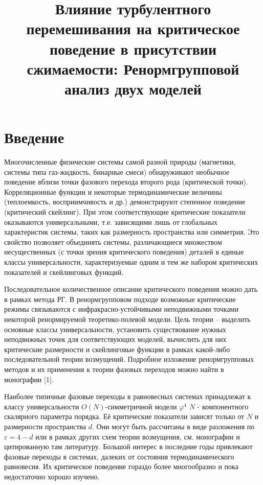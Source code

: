 \documentclass[a4paper,10pt]{article}
\title{Влияние турбулентного перемешивания на критическое поведение в присутствии сжимаемости: Ренормгрупповой анализ двух моделей}
\begin{document}
\maketitle


\section{Введение}\label{sec:Intro}
Многочисленные физические системы самой разной природы (магнетики,
системы типа газ-жидкость, бинарные смеси) обнаруживают необычное
поведение вблизи точки фазового перехода второго рода (критической
точки). Корреляционные функции и некоторые термодинамические
величины (теплоемкость, восприимчивость и др.) демонстрируют
степенное поведение (критический скейлинг). При этом
соответствующие критические показатели оказываются универсальными,
т.е. зависящими лишь от глобальных характеристик системы, таких
как размерность пространства или симметрия. Это свойство позволяет
объединять системы, различающиеся множеством несущественных (с
точки зрения критического поведения) деталей в единые классы
универсальности, характеризуемые одним и тем же набором
критических показателей и скейлинговых функций.

Последовательное количественное описание критического поведения
можно дать в рамках метода РГ. В
ренормгрупповом подходе возможные критические режимы связываются с
инфракрасно-устойчивыми неподвижными точками некоторой
ренормируемой теоретико-полевой модели. Цель теории -- выделить
основные классы универсальности, установить существование нужных
неподвижных точек для соответствующих моделей, вычислить для них
критические размерности и скейлинговые функции в рамках какой-либо
последовательной теории возмущений. Подробное изложение
ренормгрупповых методов и их применения к теории фазовых переходов
можно найти в монографии [1].

Наиболее типичные фазовые переходы в равновесных системах
принадлежат к классу универсальности $O(N)$-симметричной модели $\varphi^{4}$
 $N$ - компонентного скалярного параметра порядка. Её
критические показатели зависят только от $N$ и размерности
пространства $d$.  Они могут быть рассчитаны в виде разложения по $\varepsilon=4-d$
 или в рамках других схем теории возмущения, см. монографии \cite{Zinn,Book3} и цитированную там литературу.
Большой интерес в последние годы привлекают фазовые переходы в системах, далеких
от состояния термодинамического равновесия. Их критическое
поведение гораздо более многообразно и пока недостаточно хорошо
изучено.
\end{document}
